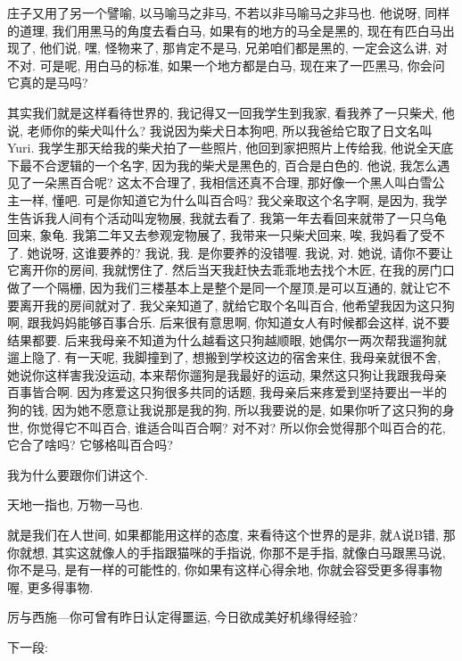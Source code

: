 \documentclass[11pt]{article}
\begin{document}
庄子又用了另一个譬喻, {\color{green} 以马喻马之非马, 不若以非马喻马之非马也.} 他说呀, 同样的道理, 我们用黑马的角度去看白马, 如果有的地方的马全是黑的, 现在有匹白马出现了, 他们说, 嘿, 怪物来了, 那肯定不是马, 兄弟咱们都是黑的, 一定会这么讲, 对不对. 可是呢, 用白马的标准, 如果一个地方都是白马, 现在来了一匹黑马, 你会问它真的是马吗? 

其实我们就是这样看待世界的, 我记得又一回我学生到我家, 看我养了一只柴犬, 他说, 老师你的柴犬叫什么? 我说因为柴犬日本狗吧, 所以我爸给它取了日文名叫 Yuri. 我学生那天给我的柴犬拍了一些照片, 他回到家把照片上传给我, 他说全天底下最不合逻辑的一个名字, 因为我的柴犬是黑色的, 百合是白色的. 他说, 我怎么遇见了一朵黑百合呢? 这太不合理了, 我相信还真不合理, 那好像一个黑人叫白雪公主一样, 懂吧. 可是你知道它为什么叫百合吗? 我父亲取这个名字啊, 是因为, 我学生告诉我人间有个活动叫宠物展, 我就去看了. 我第一年去看回来就带了一只乌龟回来, 象龟. 我第二年又去参观宠物展了, 我带来一只柴犬回来, 唉, 我妈看了受不了. 她说呀, 这谁要养的? 我说, 我. 是你要养的没错喔. 我说, 对. 她说, 请你不要让它离开你的房间, 我就愣住了. 然后当天我赶快去乖乖地去找个木匠, 在我的房门口做了一个隔栅, 因为我们三楼基本上是整个是同一个屋顶,是可以互通的, 就让它不要离开我的房间就对了. 我父亲知道了, 就给它取个名叫百合, 他希望我因为这只狗啊, 跟我妈妈能够百事合乐. 后来很有意思啊, 你知道女人有时候都会这样, 说不要结果都要. 后来我母亲不知道为什么越看这只狗越顺眼, 她偶尔一两次帮我遛狗就遛上隐了. 有一天呢, 我脚撞到了, 想搬到学校这边的宿舍来住, 我母亲就很不舍, 她说你这样害我没运动, 本来帮你遛狗是我最好的运动, 果然这只狗让我跟我母亲百事皆合啊. 因为疼爱这只狗很多共同的话题, 我母亲后来疼爱到坚持要出一半的狗的钱, 因为她不愿意让我说那是我的狗, 所以我要说的是, 如果你听了这只狗的身世, 你觉得它不叫百合, 谁适合叫百合啊? 对不对? 所以你会觉得那个叫百合的花, 它合了啥吗? 它够格叫百合吗?

我为什么要跟你们讲这个.

\begin{center}
	{\color{green} 天地一指也, 万物一马也.}
\end{center}

\vspace{-0.5cm}

就是我们在人世间, 如果都能用这样的态度, 来看待这个世界的是非, 就A说B错, 那你就想, 其实这就像人的手指跟猫咪的手指说, 你那不是手指, 就像白马跟黑马说, 你不是马, 是有一样的可能性的, 你如果有这样心得余地, 你就会容受更多得事物喔, 更多得事物.


{\Large {\color{purple} 厉与西施---你可曾有昨日认定得噩运, 今日欲成美好机缘得经验?}}

下一段:
\end{document}
